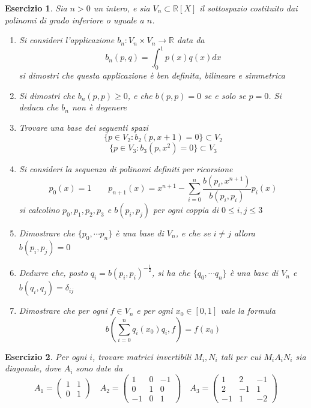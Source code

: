 \documentclass{article}
\newtheorem{es}{Esercizio}
\begin{document}
{\begin{es}
    Sia $n>0$ un intero, e sia $V_n\subset \mathbb{R}[X]$ il sottospazio costituito dai polinomi di grado inferiore o uguale a $n$. 
    \begin{enumerate}
        \item Si consideri l'applicazione $b_n:V_n\times V_n\to \mathbb{R}$ data da
        $$b_n(p,q)=\int_0^1 p(x)q(x) dx$$
        si dimostri che questa applicazione è ben definita, bilineare e simmetrica
        \item Si dimostri che $b_n(p,p)\geq 0$, e che $b(p,p)=0$ se e solo se $p=0$. Si deduca che $b_n$ non è degenere
        \item Trovare una base dei seguenti spazi
        $$\{p\in V_2: b_2(p,x+1)=0\}\subset V_2$$
        $$\{p\in V_3: b_3(p,x^2)=0\}\subset V_3$$
        \item Si consideri la sequenza di polinomi definiti per ricorsione
        $$p_0(x)=1\qquad p_{n+1}(x)=x^{n+1}-\sum_{i=0}^n \frac{b(p_i,x^{n+1})}{b(p_i,p_i)}p_i(x)$$
        si calcolino $p_0,p_1,p_2,p_3$ e $b(p_i,p_j)$ per ogni coppia di $0\leq i,j\leq 3$
        \item Dimostrare che $\{p_0,\cdots p_n\}$ è una base di $V_n$, e che se $i\neq j$ allora $b(p_i,p_j)=0$ 
        \item Dedurre che, posto $q_i=b(p_i,p_i)^{-\frac{1}{2}}$, si ha che $\{q_0,\cdots q_n\}$ è una base di $V_n$ e $b(q_i,q_j)=\delta_{ij}$
        \item Dimostrare che per ogni $f\in V_n$ e per ogni $x_0\in [0,1]$ vale la formula $$b\left(\sum_{i=0}^n q_i(x_0)q_i, f\right)=f(x_0)$$
    \end{enumerate}
\end{es}



\begin{es}
    Per ogni $i$, trovare matrici invertibili $M_i, N_i$ tali per cui $M_iA_iN_i$ sia diagonale, dove $A_i$ sono date da
    $$A_1=\begin{pmatrix}
        1 & 1\\
        0 & 1
    \end{pmatrix}\quad A_2=\begin{pmatrix}
        1 & 0 & -1\\
        0 & 1 & 0\\
        -1 & 0 & 1
    \end{pmatrix}\quad A_3=\begin{pmatrix}
        1 & 2 & -1\\
        2 & -1 & 1\\
        -1 & 1 & -2
    \end{pmatrix}$$
    
\end{es}



}
\end{document}
